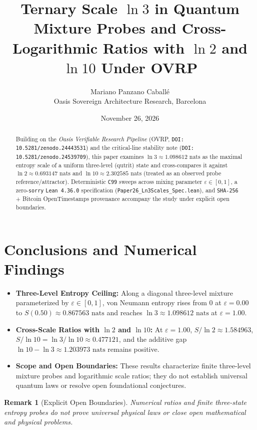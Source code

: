 \documentclass[11pt,a4paper]{article}
\title{Ternary Scale $\ln 3$ in Quantum Mixture Probes and Cross-Logarithmic Ratios with $\ln 2$ and $\ln 10$ Under OVRP}
\author{Mariano Panzano Caball\'e \\ \small Oasis Sovereign Architecture Research, Barcelona}
\date{November 26, 2026}
\newtheorem{remark}{Remark}
\begin{document}
\maketitle

\begin{abstract}
Building on the \emph{Oasis Verifiable Research Pipeline} (OVRP, \texttt{DOI: 10.5281/zenodo.24443531}) and the critical-line stability note (\texttt{DOI: 10.5281/zenodo.24539709}), this paper examines $\ln 3 \approx 1.098612\text{ nats}$ as the maximal entropy scale of a uniform three-level (qutrit) state and cross-compares it against $\ln 2 \approx 0.693147\text{ nats}$ and $\ln 10 \approx 2.302585\text{ nats}$ (treated as an observed probe reference/attractor). Deterministic \texttt{C99} sweeps across mixing parameter $\varepsilon \in [0, 1]$, a zero-\texttt{sorry} \texttt{Lean~4.36.0} specification (\texttt{Paper26\_Ln3Scales\_Spec.lean}), and \texttt{SHA-256} + Bitcoin OpenTimestamps provenance accompany the study under explicit open boundaries.
\end{abstract}

\section{Conclusions and Numerical Findings}
\begin{itemize}
  \item \textbf{Three-Level Entropy Ceiling:} Along a diagonal three-level mixture parameterized by $\varepsilon \in [0, 1]$, von Neumann entropy rises from $0$ at $\varepsilon = 0.00$ to $S(0.50) \approx 0.867563\text{ nats}$ and reaches $\ln 3 \approx 1.098612\text{ nats}$ at $\varepsilon = 1.00$.
  \item \textbf{Cross-Scale Ratios with $\ln 2$ and $\ln 10$:} At $\varepsilon = 1.00$, $S / \ln 2 \approx 1.584963$, $S / \ln 10 = \ln 3 / \ln 10 \approx 0.477121$, and the additive gap $\ln 10 - \ln 3 \approx 1.203973\text{ nats}$ remains positive.
  \item \textbf{Scope and Open Boundaries:} These results characterize finite three-level mixture probes and logarithmic scale ratios; they do not establish universal quantum laws or resolve open foundational conjectures.
\end{itemize}

\begin{remark}[Explicit Open Boundaries]
Numerical ratios and finite three-state entropy probes do not prove universal physical laws or close open mathematical and physical problems.
\end{remark}
\end{document}
